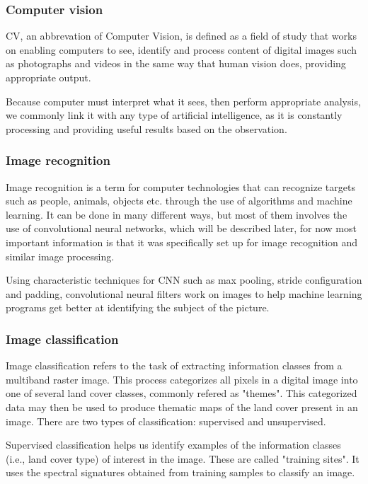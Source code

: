 \documentclass[conference]{IEEEtran}
\begin{document}
\subsubsection{Computer vision}
CV, an abbrevation of Computer Vision, is defined as a field of study that works on enabling computers to see, identify and process content of digital images such as photographs and videos in the same way that human vision does, providing appropriate output.

Because computer must interpret what it sees, then perform appropriate analysis, we commonly link it with any type of artificial intelligence, as it is constantly processing and providing useful results based on the observation.
\\
\subsubsection{Image recognition}
Image recognition is a term for computer technologies that can recognize targets such as people, animals, objects etc. through the use of algorithms and machine learning. It can be done in many different ways, but most of them involves the use of convolutional neural networks, which will be described later, for now most important information is that it was specifically set up for image recognition and similar image processing.

Using characteristic techniques for CNN such as max pooling, stride configuration and padding, convolutional neural filters work on images to help machine learning programs get better at identifying the subject of the picture.
\\
\subsubsection{Image classification}
Image classification refers to the task of extracting information classes from a multiband raster image. This process categorizes all pixels in a digital image into one of several land cover classes, commonly refered as "themes". This categorized data may then be used to produce thematic maps of the land cover present in an image. There are two types of classification: supervised and unsupervised.

Supervised classification helps us identify examples of the information classes (i.e., land cover type) of interest in the image. These are called "training sites". It uses the spectral signatures obtained from training samples to classify an image.
\end{document}
